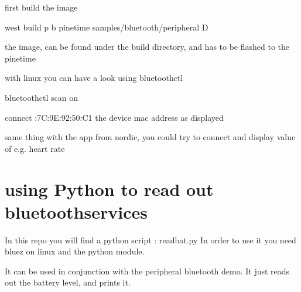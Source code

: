 \documentclass[letterpaper,10pt,english]{sphinxmanual}
\begin{document}
first build the image

\begin{sphinxVerbatim}[commandchars=\\\{\}]
  west build \PYGZhy{}p \PYGZhy{}b pinetime samples/bluetooth/peripheral \PYGZhy{}D 
\end{sphinxVerbatim}

the image, can be found under the build directory, and has to be flashed to the pinetime

with linux you can have a look using bluetoothctl

\begin{sphinxVerbatim}[commandchars=\\\{\}]
bluetoothctl
scan on


connect :7C:9E:92:50:C1 the device mac address as displayed

\end{sphinxVerbatim}

same thing with the app from nordic, you could try to connect and display value of e.g. heart rate


\section{using Python to read out bluetoothservices}
\label{\detokenize{bluetooth:using-python-to-read-out-bluetoothservices}}
In this repo you will find a python script : readbat.py
In order to use it you need bluez on linux and the python  module.

It can be used in conjunction with the peripheral bluetooth demo.
It just reads out the battery level, and prints it.

\begin{sphinxVerbatim}[commandchars=\\\{\}]
 
    

  

   

     \PYG{p}{[}\PYG{p}{]}
    
\end{sphinxVerbatim}
\end{document}
